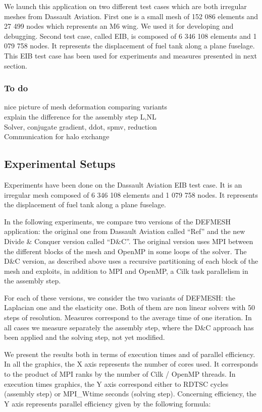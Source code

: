\documentclass{IOS-Book-Article}
\begin{document}
We launch this application on two different test cases which are both irregular meshes from Dassault Aviation.
First one is a small mesh of 152 086 elements and 27 499 nodes which represents an M6 wing. We used it for developing and debugging.
Second test case, called EIB, is composed of 6 346 108 elements and 1 079 758 nodes. It represents the displacement of fuel tank along a plane fuselage.
This EIB test case has been used for experiments and measures presented in next section.

\subsubsection{To do}
nice picture of mesh deformation comparing variants\\
explain the difference for the assembly step L,NL\\
Solver, conjugate gradient, ddot, spmv, reduction\\
Communication for halo exchange\\

\subsection{Experimental Setups}
Experiments have been done on the Dassault Aviation EIB test case. It is an irregular mesh composed of 6 346 108 elements and 1 079 758 nodes.
It represents the displacement of fuel tank along a plane fuselage.

In the following experiments, we compare two versions of the DEFMESH application: the original one from Dassault Aviation called “Ref” and the new
Divide \& Conquer version called “D\&C”. The original version uses MPI between the different blocks of the mesh and OpenMP in some loops of the solver.
The D\&C version, as described above uses a recursive partitioning of each block of the mesh and exploits, in addition to MPI and OpenMP, a Cilk task parallelism
in the assembly step.

For each of these versions, we consider the two variants of DEFMESH: the Laplacian one and the elasticity one.
Both of them are non linear solvers with 50 steps of resolution. Measures correspond to the average time of one iteration.
In all cases we measure separately the assembly step, where the D\&C approach has been applied and the solving step, not yet modified.

We present the results both in terms of execution times and of parallel efficiency.
In all the graphics, the X axis represents the number of cores used. It corresponds to the product of MPI ranks by the number of Cilk / OpenMP threads.
In execution times graphics, the Y axis correspond either to RDTSC cycles (assembly step) or MPI\_Wtime seconds (solving step).
Concerning efficiency, the Y axis represents parallel efficiency given by the following formula:
\end{document}
